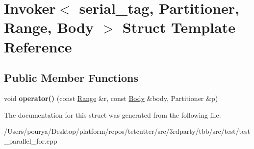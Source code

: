 \hypertarget{structInvoker_3_01serial__tag_00_01Partitioner_00_01Range_00_01Body_01_4}{}\section{Invoker$<$ serial\+\_\+tag, Partitioner, Range, Body $>$ Struct Template Reference}
\label{structInvoker_3_01serial__tag_00_01Partitioner_00_01Range_00_01Body_01_4}
\subsection*{Public Member Functions}
\begin{DoxyCompactItemize}
\item 
\hypertarget{structInvoker_3_01serial__tag_00_01Partitioner_00_01Range_00_01Body_01_4_a9ffba2cd95ae45585969746531fa9b8d}{}void {\bfseries operator()} (const \hyperlink{classtbb_1_1blocked__range}{Range} \&r, const \hyperlink{classBody}{Body} \&body, Partitioner \&p)\label{structInvoker_3_01serial__tag_00_01Partitioner_00_01Range_00_01Body_01_4_a9ffba2cd95ae45585969746531fa9b8d}

\end{DoxyCompactItemize}


The documentation for this struct was generated from the following file\+:\begin{DoxyCompactItemize}
\item 
/\+Users/pourya/\+Desktop/platform/repos/tetcutter/src/3rdparty/tbb/src/test/test\+\_\+parallel\+\_\+for.\+cpp\end{DoxyCompactItemize}
